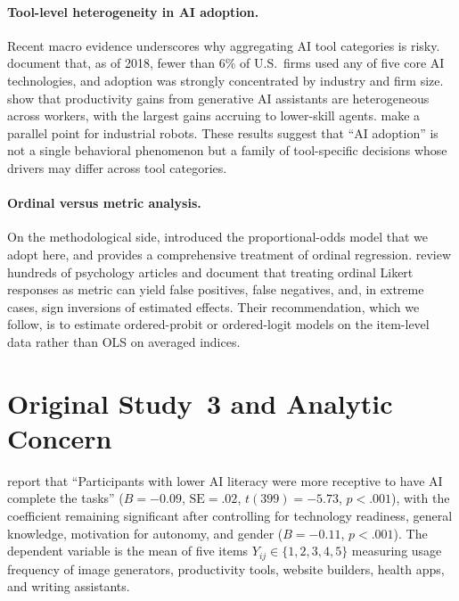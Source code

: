 \documentclass[11pt]{article}
\begin{document}
\paragraph{Tool-level heterogeneity in AI adoption.} Recent macro evidence
underscores why aggregating AI tool categories is risky. \citet{mcelheran2024ai}
document that, as of 2018, fewer than 6\% of U.S.\ firms used any of five core
AI technologies, and adoption was strongly concentrated by industry and firm
size. \citet{brynjolfsson2025generative} show that productivity gains from
generative AI assistants are heterogeneous across workers, with the largest
gains accruing to lower-skill agents. \citet{acemoglu2020robots} make a
parallel point for industrial robots. These results suggest that
``AI adoption'' is not a single behavioral phenomenon but a family of
tool-specific decisions whose drivers may differ across tool categories.

\paragraph{Ordinal versus metric analysis.} On the methodological side,
\citet{mccullagh1980regression} introduced the proportional-odds model that we
adopt here, and \citet{agresti2010analysis} provides a comprehensive treatment
of ordinal regression. \citet{liddell2018analyzing} review hundreds of
psychology articles and document that treating ordinal Likert responses as
metric can yield false positives, false negatives, and, in extreme
cases, sign inversions of estimated effects. Their recommendation, which we
follow, is to estimate ordered-probit or ordered-logit models on the
item-level data rather than OLS on averaged indices.

\section{Original Study~3 and Analytic Concern}

\citet{tully2025lower} report that ``Participants with lower AI literacy were
more receptive to have AI complete the tasks''
($B = -0.09$, $\mathrm{SE} = .02$, $t(399) = -5.73$, $p < .001$), with the
coefficient remaining significant after controlling for technology readiness,
general knowledge, motivation for autonomy, and gender ($B = -0.11$, $p <
.001$). The dependent variable is the mean of five items
$Y_{ij} \in \{1, 2, 3, 4, 5\}$ measuring usage frequency of image generators,
productivity tools, website builders, health apps, and writing assistants.
\end{document}
